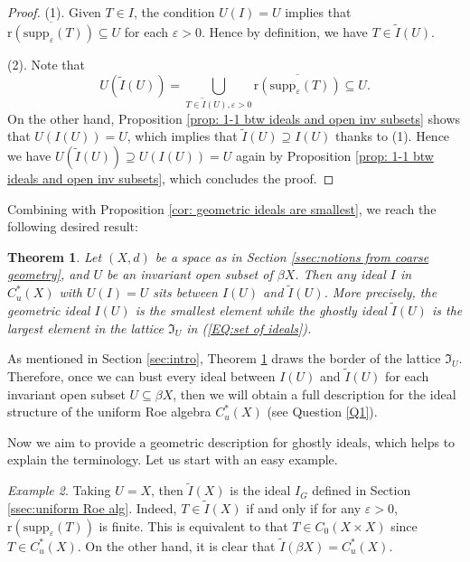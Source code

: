\documentclass[12pt, a4paper]{amsart}
\numberwithin{equation}{section}
\newtheorem{thm}{Theorem}[section]
\newtheorem{cor}[thm]{Corollary}
\theoremstyle{definition}
\theoremstyle{remark}
\newtheorem{ex}[thm]{Example}
\def\supp{\mathrm{supp}}
\def\r{\mathrm{r}}
\begin{document}
\begin{proof}
(1). Given $T \in I$, the condition $U(I)=U$ implies that $\overline{\r(\supp_\varepsilon(T))} \subseteq U$ for each $\varepsilon>0$. Hence by definition, we have $T \in \tilde{I}(U)$. 

(2). Note that
\[
U(\tilde{I}(U)) = \bigcup_{T \in \tilde{I}(U), \varepsilon >0} \overline{\r(\supp_\varepsilon(T))} \subseteq U.
\]
On the other hand, Proposition \ref{prop: 1-1 btw ideals and open inv subsets} shows that $U(I(U))=U$, which implies that $\tilde{I}(U) \supseteq I(U)$ thanks to (1). Hence we have $U(\tilde{I}(U)) \supseteq U(I(U)) =U$ again by Proposition \ref{prop: 1-1 btw ideals and open inv subsets}, which concludes the proof.
\end{proof}




Combining with Proposition \ref{cor: geometric ideals are smallest}, we reach the following desired result:
\begin{thm}\label{prop: ideals containment}
Let $(X,d)$ be a space as in Section \ref{ssec:notions from coarse geometry}, and $U$ be an invariant open subset of $\beta X$. Then any ideal $I$ in $C^*_u(X)$ with $U(I)=U$ sits between $I(U)$ and $\tilde{I}(U)$. More precisely, the geometric ideal $I(U)$ is the smallest element while the ghostly ideal $\tilde{I}(U)$ is the largest element in the lattice $\mathfrak{I}_U$ in  (\ref{EQ:set of ideals}).
\end{thm}

As mentioned in Section \ref{sec:intro}, Theorem \ref{prop: ideals containment} draws the border of the lattice $\mathfrak{I}_U$. Therefore, once we can bust every ideal between $I(U)$ and $\tilde{I}(U)$ for each invariant open subset $U \subseteq \beta X$, then we will obtain a full description for the ideal structure of the uniform Roe algebra $C^*_u(X)$ (see Question \ref{Q1}). 



Now we aim to provide a geometric description for ghostly ideals, which helps to explain the terminology. Let us start with an easy example.

\begin{ex}\label{eg: ghost ideal}
Taking $U=X$, then $\tilde{I}(X)$ is the ideal $I_G$ defined in Section \ref{ssec:uniform Roe alg}. Indeed, $T \in \tilde{I}(X)$ if and only if for any $\varepsilon>0$, $\r(\supp_\varepsilon(T))$ is finite. This is equivalent to that $T \in C_0(X \times X)$ since $T \in C^*_u(X)$. On the other hand, it is clear that $\tilde{I}(\beta X) = C^*_u(X)$.
\end{ex}
\end{document}
